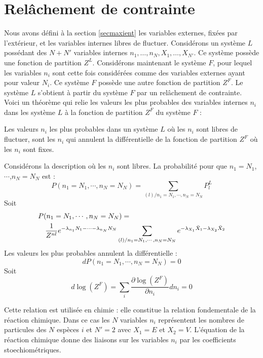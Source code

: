\documentclass[12pt]{book}
\begin{document}
\section{Rel\^achement de contrainte}\label{secrelacont}
Nous avons d\'efini \`a la section \ref{secmaxient} les variables
externes, fix\'ees par l'ext\'erieur, et les variables internes libres
de fluctuer. Consid\'erons un syst\`eme $L$ poss\'edant des $N+N'$
variables 
internes $n_1,\dots,n_N,X_1,\dots,X_{N'}$. Ce syst\`eme poss\`ede une
fonction de partition $Z^{L}$. Consid\'erons maintenant le
syst\`eme $F$, pour lequel les variables $n_i$ sont cette fois
consid\'er\'ees comme des variables externes ayant pour valeur $N_i$.
Ce syst\`eme $F$ poss\`ede une autre fonction de partition 
$Z^{F}$. Le syst\`eme $L$ s'obtient \`a partir du syst\`eme $F$ par
un rel\^achement de contrainte\cite{ph:physt:Boccara76}. Voici un
th\'eor\`eme qui relie les valeurs les  plus 
probables des variables internes $n_i$ dans les syst\`eme $L$ \`a la
fonction de partition $Z^F$ du syst\`eme $F$ :
\begin{thm}
Les valeurs $n_i$ les plus probables dans un syst\`eme $L$ o\`u les
$n_i$ sont 
libres de fluctuer, sont les $n_i$ qui annulent la diff\'erentielle de la
fonction de partition $Z^{F}$ o\`u les $n_i$ sont fixes. 
\end{thm}
\begin{pf}
Consid\'erons la description o\`u les $n_i$ sont libres. La probabilit\'e
pour que $n_1=N_1$,$\cdots$,$n_N=N_N$ est :
\begin{equation}
P(n_1=N_1,\cdots,n_N=N_N)=\sum_{(l)/n_1=N_1,\cdots,n_N=N_N}P^{L}_l
\end{equation}
Soit
\begin{eqnarray}
\lefteqn{P(n_1=N_1,\cdots,n_N=N_N) = }\\
&&\frac{1}{Z^{nl}} e^
{-\lambda_{n_1}N_1-\cdots-\lambda_{n_N}N_N} \sum_{(l)/n_1 =
N_1,\cdots,n_N=N_N} e^ {-\lambda_{X_1}\bar X_1-\lambda_{X_2}\bar X_2} 
\end{eqnarray}
Les valeurs les plus probables annulent la diff\'erentielle :
\begin{equation}
dP(n_1=N_1,\cdots,n_N=N_N) = 0
\end{equation}
Soit
\begin{equation}
d\log(Z^{F})=\sum_i \frac{\partial \log(Z^{F})}{\partial n_i}dn_i=0
\end{equation}
\end{pf}
\begin{rem}
Cette relation est utilis\'ee en chimie : elle constitue la relation
fondementale de la r\'eaction chimique. Dans ce cas les $N$ variables
$n_i$ 
repr\'esentent les nombres de particules des $N$ esp\`eces $i$ et $N'=2$
avec $X_1=E$ et $X_2=V$. L'\'equation de la r\'eaction chimique donne
des liaisons sur les variables 
$n_i$ par les coefficients stoechiom\'etriques.
\end{rem}
\end{document}
